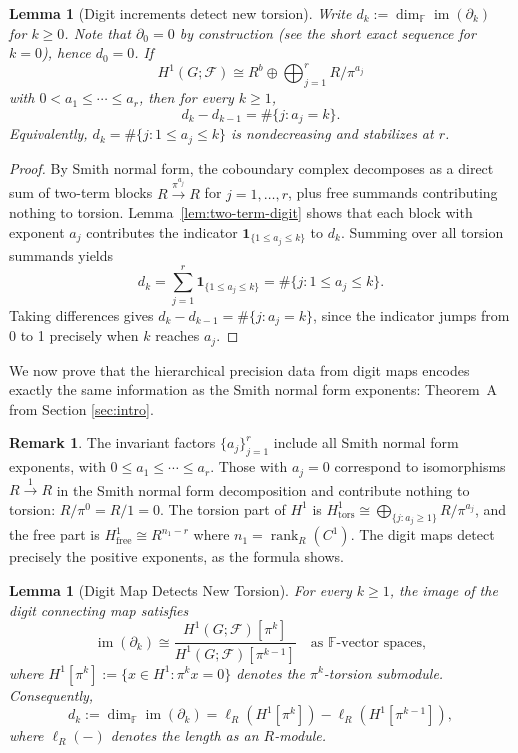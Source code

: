 \documentclass[11pt]{amsart}
\theoremstyle{plain}
\newtheorem{lemma}[theorem]{Lemma}
\theoremstyle{definition}
\newtheorem{remark}[theorem]{Remark}
\newcommand{\Ring}{R}                          %
\newcommand{\unif}{\pi}                        %
\newcommand{\sheaf}[1]{\mathcal{#1}}                  %
\newcommand{\free}{\mathrm{free}}
\newcommand{\tors}{\mathrm{tors}}
\newcommand{\Digit}[1]{\partial_{#1}}%
\DeclareMathOperator{\im}{im}                         %
\DeclareMathOperator{\rank}{rank}
\begin{document}
\begin{lemma}[Digit increments detect new torsion]
\label{lem:digit-increment}
Write $d_k := \dim_{\mathbb{F}} \im(\Digit{k})$ for $k \ge 0$. Note that $\Digit{0} = 0$ by construction (see the short exact sequence for $k=0$), hence $d_0 = 0$. If 
\[
H^1(G;\sheaf{F}) \cong \Ring^{b} \oplus \bigoplus_{j=1}^{r} \Ring/\unif^{a_j}
\]
with $0 < a_1 \le \cdots \le a_r$, then for every $k \ge 1$,
\[
d_k - d_{k-1} = \#\{j : a_j = k\}.
\]
Equivalently, $d_k = \#\{j : 1 \le a_j \le k\}$ is nondecreasing and stabilizes at $r$.
\end{lemma}

\begin{proof}
By Smith normal form, the coboundary complex decomposes as a direct sum of two-term blocks $\Ring \xrightarrow{\unif^{a_j}} \Ring$ for $j = 1, \ldots, r$, plus free summands contributing nothing to torsion. Lemma~\ref{lem:two-term-digit} shows that each block with exponent $a_j$ contributes the indicator $\mathbf{1}_{\{1 \le a_j \le k\}}$ to $d_k$. Summing over all torsion summands yields
\[
d_k = \sum_{j=1}^r \mathbf{1}_{\{1 \le a_j \le k\}} = \#\{j : 1 \le a_j \le k\}.
\]
Taking differences gives $d_k - d_{k-1} = \#\{j : a_j = k\}$, since the indicator jumps from 0 to 1 precisely when $k$ reaches $a_j$.
\end{proof}

We now prove that the hierarchical precision data from digit maps encodes exactly the same information as the Smith normal form exponents: Theorem~A from Section \ref{sec:intro}.


\begin{remark}
\label{rem:torsion-exponents}
The invariant factors $\{a_j\}_{j=1}^r$ include all Smith normal form exponents, with $0 \le a_1 \le \cdots \le a_r$. Those with $a_j = 0$ correspond to isomorphisms $\Ring \xrightarrow{1} \Ring$ in the Smith normal form decomposition and contribute nothing to torsion: $\Ring/\unif^0 = \Ring/1 = 0$. The torsion part of $H^1$ is $H^1_{\tors} \cong \bigoplus_{\{j: a_j \ge 1\}} \Ring/\unif^{a_j}$, and the free part is $H^1_{\free} \cong \Ring^{n_1 - r}$ where $n_1 = \rank_\Ring(C^1)$. The digit maps detect precisely the positive exponents, as the formula shows.
\end{remark}

\begin{lemma}[Digit Map Detects New Torsion]
\label{lem:digit-new-torsion}
For every $k \geq 1$, the image of the digit connecting map satisfies
\[
\im(\Digit{k}) \cong \frac{H^1(G;\sheaf{F})[\unif^k]}{H^1(G;\sheaf{F})[\unif^{k-1}]} \quad \text{as $\mathbb{F}$-vector spaces},
\]
where $H^1[\unif^k] := \{x \in H^1 : \unif^k x = 0\}$ denotes the $\unif^k$-torsion submodule. Consequently,
\[
d_k := \dim_{\mathbb{F}} \im(\Digit{k}) = \ell_\Ring(H^1[\unif^k]) - \ell_\Ring(H^1[\unif^{k-1}]),
\]
where $\ell_\Ring(-)$ denotes the length as an $\Ring$-module.
\end{lemma}
\end{document}
